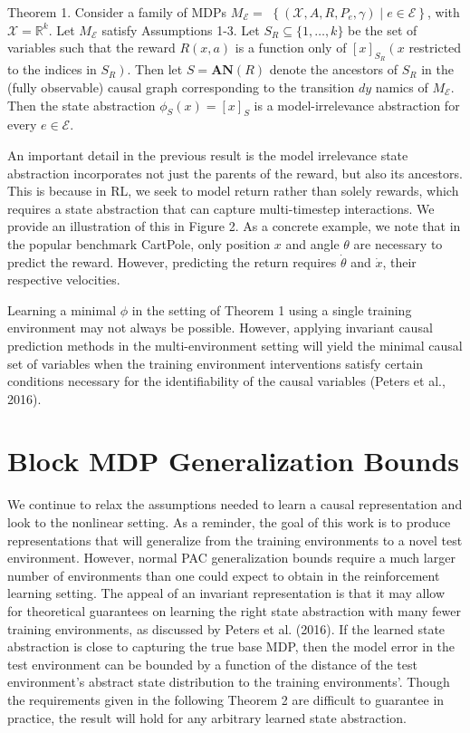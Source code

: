 \documentclass[10pt]{article}
\begin{document}
Theorem 1. Consider a family of MDPs $M_{\mathcal{E}}=$ $\left\{\left(\mathcal{X}, A, R, P_{e}, \gamma\right) \mid e \in \mathcal{E}\right\}$, with $\mathcal{X}=\mathbb{R}^{k}$. Let $M_{\mathcal{E}}$ satisfy Assumptions 1-3. Let $S_{R} \subseteq\{1, \ldots, k\}$ be the set of variables such that the reward $R(x, a)$ is a function only of $[x]_{S_{R}}\left(x\right.$ restricted to the indices in $\left.S_{R}\right)$. Then let $S=\boldsymbol{A} \boldsymbol{N}(R)$ denote the ancestors of $S_{R}$ in the (fully observable) causal graph corresponding to the transition $d y$ namics of $M_{\mathcal{E}}$. Then the state abstraction $\phi_{S}(x)=[x]_{S}$ is a model-irrelevance abstraction for every $e \in \mathcal{E}$.

An important detail in the previous result is the model irrelevance state abstraction incorporates not just the parents of the reward, but also its ancestors. This is because in RL, we seek to model return rather than solely rewards, which requires a state abstraction that can capture multi-timestep interactions. We provide an illustration of this in Figure 2. As a concrete example, we note that in the popular benchmark CartPole, only position $x$ and angle $\theta$ are necessary to predict the reward. However, predicting the return requires $\dot{\theta}$ and $\dot{x}$, their respective velocities.

Learning a minimal $\phi$ in the setting of Theorem 1 using a single training environment may not always be possible. However, applying invariant causal prediction methods in the multi-environment setting will yield the minimal causal set of variables when the training environment interventions satisfy certain conditions necessary for the identifiability of the causal variables (Peters et al., 2016).

\section{Block MDP Generalization Bounds}
We continue to relax the assumptions needed to learn a causal representation and look to the nonlinear setting. As a reminder, the goal of this work is to produce representations that will generalize from the training environments to a novel test environment. However, normal PAC generalization bounds require a much larger number of environments than one could expect to obtain in the reinforcement learning setting. The appeal of an invariant representation is that it may allow for theoretical guarantees on learning the right state abstraction with many fewer training environments, as discussed by Peters et al. (2016). If the learned state abstraction is close to capturing the true base MDP, then the model error in the test environment can be bounded by a function of the distance of the test environment's abstract state distribution to the training environments'. Though the requirements given in the following Theorem 2 are difficult to guarantee in practice, the result will hold for any arbitrary learned state abstraction.
\end{document}
